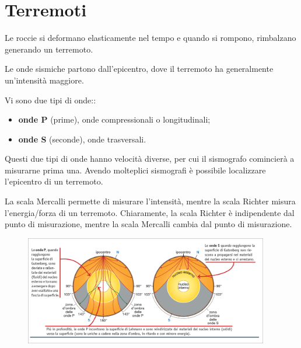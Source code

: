 \documentclass[a4paper]{article}
\begin{document}
\pagebreak

\section{Terremoti}


Le roccie si deformano elasticamente nel tempo e quando si rompono,
rimbalzano generando un terremoto.




Le onde sismiche partono dall'epicentro, dove il terremoto ha generalmente un'intensità maggiore.


Vi sono due tipi di onde::
\begin{itemize}
    \item \textbf{onde P} (prime), onde compressionali o longitudinali;
    \item \textbf{onde S} (seconde), onde trasversali.
\end{itemize}

Questi due tipi di onde hanno velocità diverse, per cui il sismografo comincierà a misurarne
prima una.
Avendo molteplici sismografi è possibile localizzare l'epicentro di un terremoto.

La scala Mercalli permette di misurare l'intensità, mentre la scala Richter misura l'energia/forza di un terremoto.
Chiaramente, la scala Richter è indipendente dal punto di misurazione, mentre la scala Mercalli cambia dal punto di misurazione.

\begin{center}
\begin{figure}[h]
    \centering
    \includegraphics[width=0.95\textwidth]{./onde_terremoto.png}
\end{figure}
\end{center}
\end{document}
